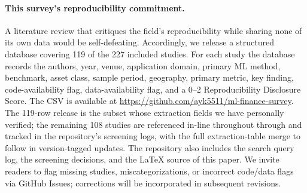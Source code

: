 \paragraph{This survey's reproducibility commitment.} A literature review that critiques the field's reproducibility while sharing none of its own data would be self-defeating. Accordingly, we release a structured database covering 119 of the 227 included studies. For each study the database records the authors, year, venue, application domain, primary ML method, benchmark, asset class, sample period, geography, primary metric, key finding, code-availability flag, data-availability flag, and a 0--2 Reproducibility Disclosure Score. The CSV is available at \url{https://github.com/ayk5511/ml-finance-survey}. The 119-row release is the subset whose extraction fields we have personally verified; the remaining 108 studies are referenced in-line throughout  through  and tracked in the repository's screening logs, with the full extraction-table merge to follow in version-tagged updates. The repository also includes the search query log, the screening decisions, and the LaTeX source of this paper. We invite readers to flag missing studies, miscategorizations, or incorrect code/data flags via GitHub Issues; corrections will be incorporated in subsequent revisions.
